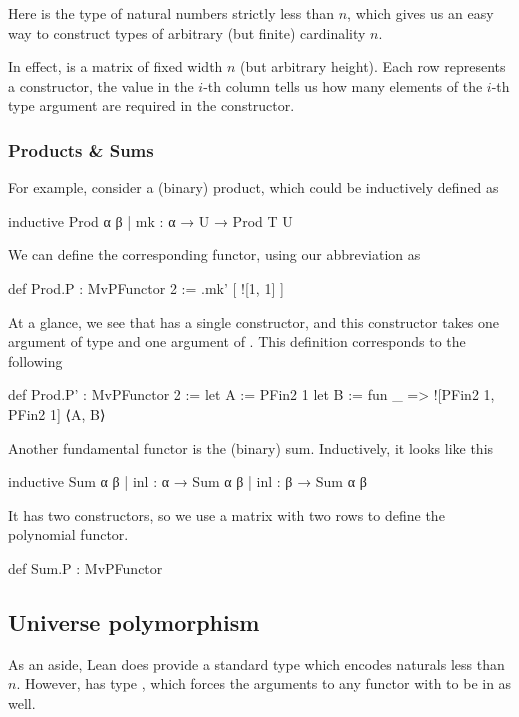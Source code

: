 \documentclass[titlepage]{report}
\begin{document}
Here  is the type of natural numbers strictly less than $n$, which gives us an easy
way to construct types of arbitrary (but finite) cardinality $n$.

In effect,  is a matrix of fixed width $n$ (but arbitrary height). 
Each row represents a constructor, the value in the $i$-th column tells us how many elements of the 
$i$-th type argument are required in the constructor.

\subsubsection*{Products \& Sums}
For example, consider a (binary) product, which could be inductively defined as 
\begin{leancode}
    inductive Prod α β
      | mk : α → U → Prod T U
\end{leancode}

We can define the corresponding functor, using our abbreviation as
\begin{leancode}
    def Prod.P : MvPFunctor 2 
      := .mk' [
        ![1, 1]
      ]
\end{leancode}
At a glance, we see that  has a single constructor, and this constructor takes one
argument of type  and one argument of .
This definition corresponds to the following
\begin{leancode}
    def Prod.P' : MvPFunctor 2 
      :=  let A := PFin2 1
          let B := fun _ => ![PFin2 1, PFin2 1]
          ⟨A, B⟩
\end{leancode}



Another fundamental functor is the (binary) sum. Inductively, it looks like this
\begin{leancode}
    inductive Sum α β 
      | inl : α → Sum α β 
      | inl : β → Sum α β 
\end{leancode}
It has two constructors, so we use a matrix with two rows to define the polynomial functor.
\begin{leancode}
    def Sum.P : MvPFunctor
\end{leancode}




\subsection*{Universe polymorphism}

As an aside, Lean does provide a standard  type which encodes naturals less than $n$.
However,  has type , which forces the arguments to any functor  with
 to be in  as well.
\end{document}
